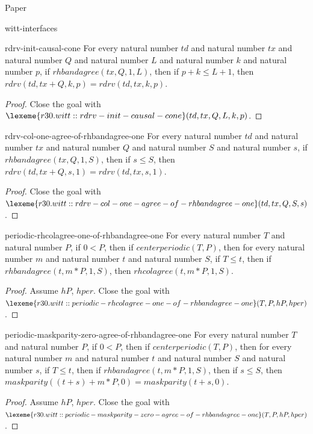 \begin{lexlean}{Paper}
\begin{section}{witt-interfaces}
  \begin{theorem}{rdrv-init-causal-cone}
  For every natural number \(td\) and natural number \(tx\) and natural number \(Q\) and natural number \(L\) and natural number \(k\) and natural number \(p\), if \(rhbandagree(tx, Q, 1, L)\), then if \(p + k ≤ L + 1\), then \(rdrv(td, tx + Q, k, p) = rdrv(td, tx, k, p)\).
  \begin{proof}
  Close the goal with \(\lexeme{r30.witt::rdrv-init-causal-cone}(td, tx, Q, L, k, p)\).
  \end{proof}
  \end{theorem}

  \begin{theorem}{rdrv-col-one-agree-of-rhbandagree-one}
  For every natural number \(td\) and natural number \(tx\) and natural number \(Q\) and natural number \(S\) and natural number \(s\), if \(rhbandagree(tx, Q, 1, S)\), then if \(s ≤ S\), then \(rdrv(td, tx + Q, s, 1) = rdrv(td, tx, s, 1)\).
  \begin{proof}
  Close the goal with \(\lexeme{r30.witt::rdrv-col-one-agree-of-rhbandagree-one}(td, tx, Q, S, s)\).
  \end{proof}
  \end{theorem}

  \begin{theorem}{periodic-rhcolagree-one-of-rhbandagree-one}
  For every natural number \(T\) and natural number \(P\), if \(0 < P\), then if \(centerperiodic(T, P)\), then for every natural number \(m\) and natural number \(t\) and natural number \(S\), if \(T ≤ t\), then if \(rhbandagree(t, m * P, 1, S)\), then \(rhcolagree(t, m * P, 1, S)\).
  \begin{proof}
  Assume \(hP\), \(hper\).
  Close the goal with \(\lexeme{r30.witt::periodic-rhcolagree-one-of-rhbandagree-one}(T, P, hP, hper)\).
  \end{proof}
  \end{theorem}

  \begin{theorem}{periodic-maskparity-zero-agree-of-rhbandagree-one}
  For every natural number \(T\) and natural number \(P\), if \(0 < P\), then if \(centerperiodic(T, P)\), then for every natural number \(m\) and natural number \(t\) and natural number \(S\) and natural number \(s\), if \(T ≤ t\), then if \(rhbandagree(t, m * P, 1, S)\), then if \(s ≤ S\), then \(maskparity((t + s) + m * P, 0) = maskparity(t + s, 0)\).
  \begin{proof}
  Assume \(hP\), \(hper\).
  Close the goal with \(\lexeme{r30.witt::periodic-maskparity-zero-agree-of-rhbandagree-one}(T, P, hP, hper)\).
  \end{proof}
  \end{theorem}


\end{section}
\end{lexlean}
